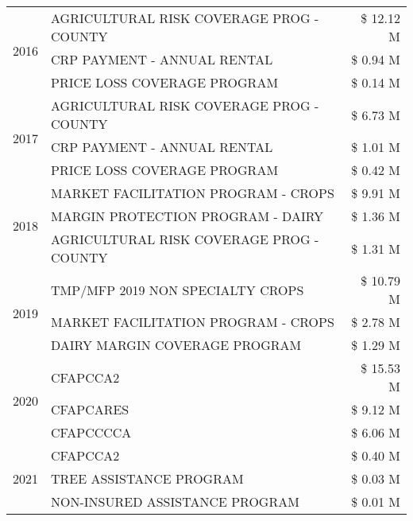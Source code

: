 \begin{tabular}{llr}
\cline{1-3}
\multirow[t]{3}{*}{2016} & AGRICULTURAL RISK COVERAGE PROG - COUNTY & \$ 12.12 M \\
 & CRP PAYMENT - ANNUAL RENTAL & \$ 0.94 M \\
 & PRICE LOSS COVERAGE PROGRAM & \$ 0.14 M \\
\cline{1-3}
\multirow[t]{3}{*}{2017} & AGRICULTURAL RISK COVERAGE PROG - COUNTY & \$ 6.73 M \\
 & CRP PAYMENT - ANNUAL RENTAL & \$ 1.01 M \\
 & PRICE LOSS COVERAGE PROGRAM & \$ 0.42 M \\
\cline{1-3}
\multirow[t]{3}{*}{2018} & MARKET FACILITATION PROGRAM - CROPS & \$ 9.91 M \\
 & MARGIN PROTECTION PROGRAM - DAIRY & \$ 1.36 M \\
 & AGRICULTURAL RISK COVERAGE PROG - COUNTY & \$ 1.31 M \\
\cline{1-3}
\multirow[t]{3}{*}{2019} & TMP/MFP 2019 NON SPECIALTY CROPS & \$ 10.79 M \\
 & MARKET FACILITATION PROGRAM - CROPS & \$ 2.78 M \\
 & DAIRY MARGIN COVERAGE PROGRAM & \$ 1.29 M \\
\cline{1-3}
\multirow[t]{3}{*}{2020} & CFAPCCA2 & \$ 15.53 M \\
 & CFAPCARES & \$ 9.12 M \\
 & CFAPCCCCA & \$ 6.06 M \\
\cline{1-3}
\multirow[t]{3}{*}{2021} & CFAPCCA2 & \$ 0.40 M \\
 & TREE ASSISTANCE PROGRAM & \$ 0.03 M \\
 & NON-INSURED ASSISTANCE PROGRAM & \$ 0.01 M \\
\cline{1-3}
\bottomrule
\end{tabular}
